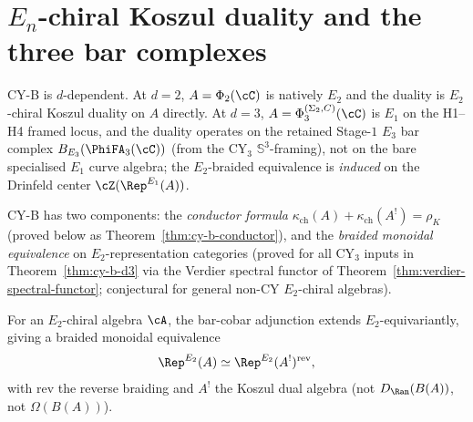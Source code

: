 \section{\texorpdfstring{$E_n$}{E-n}-chiral Koszul duality and the three bar complexes}
\label{sec:e2-koszul-and-bar}

CY-B is $d$-dependent. At $d = 2$, $A = \Phi_2(\cC)$ is natively $E_2$
and the duality is $E_2$-chiral Koszul duality on $A$ directly.
At $d = 3$, $A = \Phi_3^{(\Sigma_2,C)}(\cC)$ is $E_1$ on the H1--H4 framed locus, and the duality operates on the retained Stage-$1$
$E_3$ bar complex $B_{E_3}(\PhiFA_3(\cC))$ (from the CY$_3$ $\mathbb{S}^3$-framing), not on the bare specialised $E_1$ curve algebra;
the $E_2$-braided equivalence is \emph{induced} on the Drinfeld center
$\cZ(\Rep^{E_1}(A))$.

CY-B has two components: the \emph{conductor formula}
$\kappa_{\mathrm{ch}}(A) + \kappa_{\mathrm{ch}}(A^!) = \rho_K$
(proved below as Theorem~\ref{thm:cy-b-conductor}), and the
\emph{braided monoidal equivalence} on $E_2$-representation categories
(proved for all CY$_3$ inputs in Theorem~\ref{thm:cy-b-d3} via
the Verdier spectral functor of Theorem~\ref{thm:verdier-spectral-functor};
conjectural for general non-CY $E_2$-chiral algebras).

\begin{conjecture}
\label{conj:e2-koszul}
\ClaimStatusConjectured
For an $E_2$-chiral algebra $\cA$, the bar-cobar adjunction extends
$E_2$-equivariantly, giving a braided monoidal equivalence
\[
 \Rep^{E_2}(A) \simeq \Rep^{E_2}(A^!)^{\mathrm{rev}},
\]
with $\mathrm{rev}$ the reverse braiding and $A^!$ the Koszul dual
algebra (not $D_{\Ran}(B(A))$, not $\Omega(B(A))$).
\end{conjecture}

